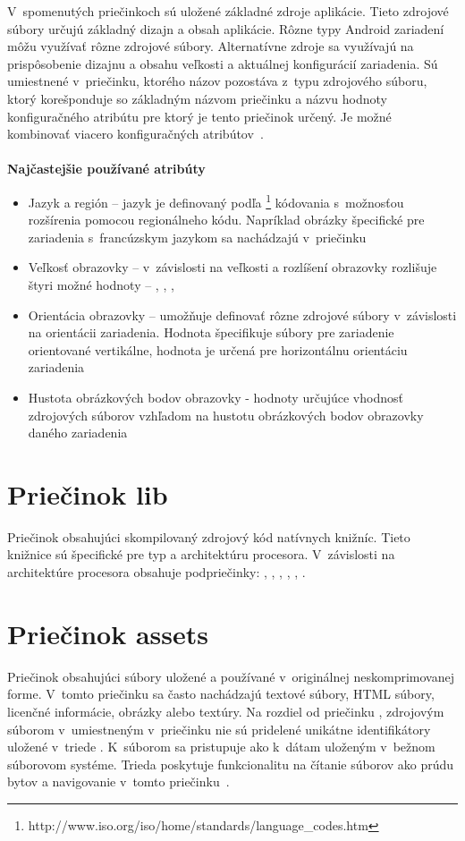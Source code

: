 \noindent V~spomenutých priečinkoch sú uložené základné zdroje aplikácie. Tieto zdrojové súbory určujú základný dizajn a obsah aplikácie. Rôzne typy Android zariadení môžu využívať rôzne zdrojové súbory. Alternatívne zdroje sa využívajú na prispôsobenie dizajnu a obsahu veľkosti a aktuálnej konfigurácií zariadenia. Sú umiestnené v~priečinku, ktorého názov pozostáva z~typu zdrojového súboru, ktorý korešponduje so základným názvom priečinku a názvu hodnoty konfiguračného atribútu pre ktorý je tento priečinok určený. Je možné kombinovať viacero konfiguračných atribútov~\cite{providingAltRes}.\\\\
\textbf{Najčastejšie používané atribúty}
\begin{itemize}
\item Jazyk a región – jazyk je definovaný podľa \footnote{http://www.iso.org/iso/home/standards/language\_codes.htm} kódovania s~možnosťou rozšírenia pomocou  regionálneho kódu. Napríklad obrázky špecifické pre zariadenia s~francúzskym jazykom sa nachádzajú v~priečinku 
\item Veľkosť obrazovky –  v~závislosti na veľkosti a rozlíšení obrazovky rozlišuje štyri možné hodnoty -- , , , 
\item Orientácia obrazovky – umožňuje definovať rôzne zdrojové súbory v~závislosti na orientácii zariadenia. Hodnota  špecifikuje súbory pre zariadenie orientované vertikálne, hodnota  je určená pre horizontálnu orientáciu zariadenia	
\item Hustota obrázkových bodov obrazovky -  hodnoty určujúce vhodnosť zdrojových súborov vzhľadom na hustotu obrázkových bodov obrazovky daného zariadenia
\end{itemize}


\section{Priečinok lib}
\label{lib}
Priečinok obsahujúci skompilovaný zdrojový kód natívnych knižníc. Tieto knižnice sú špecifické pre typ a architektúru procesora. V~závislosti na architektúre procesora obsahuje podpriečinky: , , , , , .

\section{Priečinok assets}
\label{assets}
Priečinok obsahujúci súbory uložené a používané v~originálnej neskomprimovanej forme. V~tomto priečinku sa často nachádzajú textové súbory, HTML súbory, licenčné informácie, obrázky alebo textúry. Na rozdiel od priečinku , zdrojovým súborom v~umiestneným v~priečinku  nie sú pridelené unikátne identifikátory uložené v~triede . K~súborom sa pristupuje ako k~dátam uloženým v~bežnom súborovom systéme. Trieda  poskytuje funkcionalitu na čítanie súborov ako prúdu bytov a  navigovanie v~tomto priečinku~\cite{AssetManager}.

